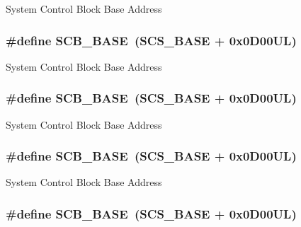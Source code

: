 System Control Block Base Address \hypertarget{group___c_m_s_i_s__core__base_gad55a7ddb8d4b2398b0c1cfec76c0d9fd}{
\subsubsection[{S\-C\-B\-\_\-\-B\-A\-S\-E}]{\setlength{\rightskip}{0pt plus 5cm}\#define S\-C\-B\-\_\-\-B\-A\-S\-E~({\bf S\-C\-S\-\_\-\-B\-A\-S\-E} +  0x0\-D00\-U\-L)}}\label{group___c_m_s_i_s__core__base_gad55a7ddb8d4b2398b0c1cfec76c0d9fd}
System Control Block Base Address \hypertarget{group___c_m_s_i_s__core__base_gad55a7ddb8d4b2398b0c1cfec76c0d9fd}{
\subsubsection[{S\-C\-B\-\_\-\-B\-A\-S\-E}]{\setlength{\rightskip}{0pt plus 5cm}\#define S\-C\-B\-\_\-\-B\-A\-S\-E~({\bf S\-C\-S\-\_\-\-B\-A\-S\-E} +  0x0\-D00\-U\-L)}}\label{group___c_m_s_i_s__core__base_gad55a7ddb8d4b2398b0c1cfec76c0d9fd}
System Control Block Base Address \hypertarget{group___c_m_s_i_s__core__base_gad55a7ddb8d4b2398b0c1cfec76c0d9fd}{
\subsubsection[{S\-C\-B\-\_\-\-B\-A\-S\-E}]{\setlength{\rightskip}{0pt plus 5cm}\#define S\-C\-B\-\_\-\-B\-A\-S\-E~({\bf S\-C\-S\-\_\-\-B\-A\-S\-E} +  0x0\-D00\-U\-L)}}\label{group___c_m_s_i_s__core__base_gad55a7ddb8d4b2398b0c1cfec76c0d9fd}
System Control Block Base Address \hypertarget{group___c_m_s_i_s__core__base_gad55a7ddb8d4b2398b0c1cfec76c0d9fd}{
\subsubsection[{S\-C\-B\-\_\-\-B\-A\-S\-E}]{\setlength{\rightskip}{0pt plus 5cm}\#define S\-C\-B\-\_\-\-B\-A\-S\-E~({\bf S\-C\-S\-\_\-\-B\-A\-S\-E} +  0x0\-D00\-U\-L)}}\label{group___c_m_s_i_s__core__base_gad55a7ddb8d4b2398b0c1cfec76c0d9fd}
